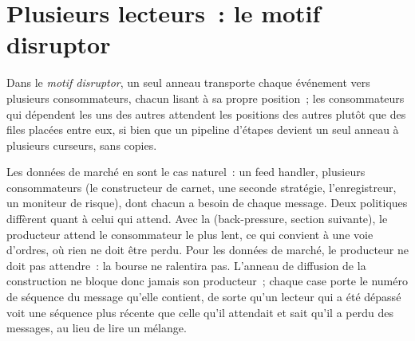 \section{Plusieurs lecteurs~: le motif disruptor}

\begin{definition}\label{def:ll:queues-ring-buffers-and-shared-memory:disruptor}
Dans le \emph{motif disruptor}, un seul anneau transporte chaque événement vers plusieurs consommateurs, chacun lisant à sa
propre position~; les consommateurs qui dépendent les uns des autres attendent les positions des autres plutôt que des files placées entre eux, si bien que
un pipeline d'étapes devient un seul anneau à plusieurs curseurs, sans copies.
\end{definition}

Les données de marché en sont le cas naturel~: un feed handler, plusieurs consommateurs (le constructeur de carnet, une seconde stratégie, l'enregistreur,
un moniteur de risque), dont chacun a besoin de chaque message. Deux politiques diffèrent quant à celui qui attend. Avec la  (back-pressure, section suivante), le
producteur attend le consommateur le plus lent, ce qui convient à une voie d'ordres, où rien ne doit être perdu. Pour les données de marché, le
producteur ne doit pas attendre~: la bourse ne ralentira pas. L'anneau de diffusion de la construction ne bloque donc jamais son producteur~; chaque
case porte le numéro de séquence du message qu'elle contient, de sorte qu'un lecteur qui a été dépassé voit une séquence plus récente que celle
qu'il attendait et sait qu'il a perdu des messages, au lieu de lire un mélange.

